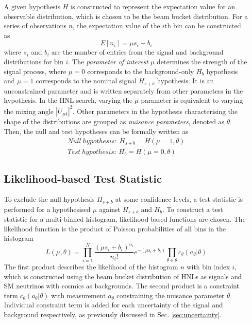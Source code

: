 A given hypothesis $H$ is constructed to represent the expectation value for an observable distribution, which is chosen to be the beam bucket distribution.
For a series of observations $n$, the expectation value of the $i$th bin can be constructed as 
\begin{equation}
    E[n_i] = \mu s_i + b_i    
\end{equation}
where $s_i$ and $b_i$ are the number of entries from the signal and background distributions for bin $i$.
The \textit{parameter of interest} $\mu$ determines the strength of the signal process, where $\mu = 0$ corresponds to the background-only $H_{b}$ hypothesis and $\mu = 1$ corresponds to the nominal signal $H_{s+b}$ hypothesis.
It is an unconstrained parameter and is written separately from other parameters in the hypothesis.
In the HNL search, varying the $\mu$ parameter is equivalent to varying the mixing angle $|U_{\mu4}|^{2}$.
Other parameters in the hypothesis characterising the shape of the distributions are grouped as \textit{nuisance parameters}, denoted as $\theta$.
Then, the null and test hypotheses can be formally written as
\begin{align}
    Null\ hypothesis:\ H_{s+b} = H (\mu = 1, \theta) \\
    Test\ hypothesis:\ H_{b} = H (\mu = 0, \theta)
\end{align}

\subsection{Likelihood-based Test Statistic}

To exclude the null hypothesis $H_{s+b}$ at some confidence levels, a test statistic is performed for a hypothesised $\mu$ against $H_{s+b}$ and $H_{b}$.
To construct a test statistic for a multi-binned histogram, likelihood-based functions are chosen.
The likelihood function is the product of Poisson probabilities of all bins in the histogram \cite{asymptotic_test}
\begin{equation}
\label{eq:LLH_func}
    L(\mu, \theta) =  \prod_{i=1}^{N} \frac{(\mu s_i + b_i)^{n_i}}{n_i!} e^{-(\mu s_i + b_i)}  \prod_{\theta\in\theta} c_\theta(a_\theta|\theta)
\end{equation}
The first product describes the likelihood of the histogram $n$ with bin index $i$, which is constructed using the beam bucket distribution of HNLs as signals and SM neutrinos with cosmics as backgrounds. 
The second product is a constraint term $c_\theta(a_\theta|\theta)$ with measurement $a_\theta$ constraining the nuisance parameter $\theta$.
Individual constraint term is added for each uncertainty of the signal and background respectively, as previously discussed in Sec. \ref{sec:uncertainty}. 

